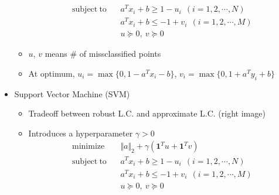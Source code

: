 \begin{itemize}
\begin{itemize}
$$\begin{aligned}
                \mathrm{subject~to}~~&~~a^Tx_i+b\geq1-u_i~~(i=1,2,\cdots,N) \\
                    &~~a^Tx_i+b\leq-1+v_i~~(i=1,2,\cdots,M) \\
                    &~~u\succeq0,~v\succeq0
            \end{aligned} $$
        \item $u$, $v$ means \# of missclassified points
        \item At optimum, $u_i=\max\{0,1-a^Tx_i-b\}$, $v_i=\max\{0,1+a^Ty_i+b\}$
    \end{itemize}
    \item Support Vector Machine (SVM)
    \begin{itemize}
        \item Tradeoff between robust L.C. and approximate L.C. (right image)
        \item Introduces a hyperparameter $\gamma>0$
            $$ \begin{aligned}
                \mathrm{minimize}~~&~~\Vert a\Vert_2+\gamma(\mathbf{1}^Tu+\mathbf{1}^Tv) \\
                \mathrm{subject~to}~~&~~a^Tx_i+b\geq1-u_i~~(i=1,2,\cdots,N) \\
                    &~~a^Tx_i+b\leq-1+v_i~~(i=1,2,\cdots,M) \\
                    &~~u\succeq0,~v\succeq0
            \end{aligned} $$
    \end{itemize}
\end{itemize}
\begin{figures}
\end{figures}
